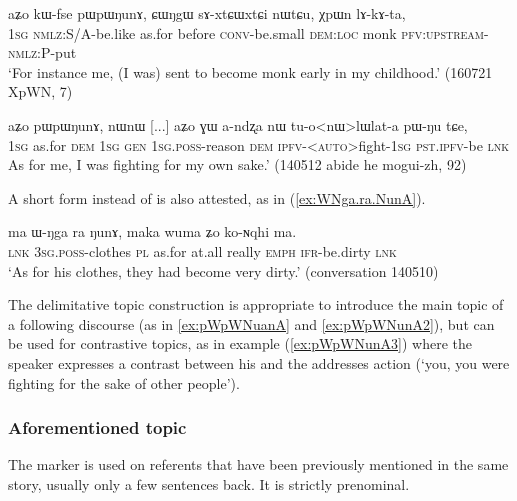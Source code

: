 \begin{exe}
\ex \label{ex:pWpWNunA2}
\gll  aʑo kɯ-fse pɯpɯŋunɤ, ɕɯŋgɯ sɤ-xtɕɯ\redp{}xtɕi nɯtɕu, χpɯn lɤ-kɤ-ta, \\
\textsc{1sg} \textsc{nmlz}:S/A-be.like as.for  before \textsc{conv}-\redp{}be.small \textsc{dem}:\textsc{loc} monk \textsc{pfv}:\textsc{upstream}-\textsc{nmlz}:P-put \\
\glt `For instance me, (I was) sent to become monk early in my childhood.' (160721 XpWN, 7)
  \end{exe}

\begin{exe}
\ex \label{ex:pWpWNunA3}
\gll aʑo pɯpɯŋunɤ, nɯnɯ [...] aʑo ɣɯ a-ndʐa nɯ tu-o<nɯ>lɯlat-a pɯ-ŋu tɕe, \\
\textsc{1sg} as.for \textsc{dem} { } \textsc{1sg} \textsc{gen} \textsc{1sg}.\textsc{poss}-reason \textsc{dem} \textsc{ipfv}-<\textsc{auto}>fight-\textsc{1sg} \textsc{pst}.\textsc{ipfv}-be \textsc{lnk} \\
\glt  As for me, I was fighting for my own sake.' (140512 abide he mogui-zh, 92)
 \end{exe}
 
A short form  instead of  is also attested, as in (\ref{ex:WNga.ra.NunA}).

\begin{exe}
\ex \label{ex:WNga.ra.NunA}
\gll ma ɯ-ŋga ra ŋunɤ, maka wuma ʑo ko-ɴqhi ma. \\
\textsc{lnk} \textsc{3sg}.\textsc{poss}-clothes \textsc{pl} as.for at.all really \textsc{emph} \textsc{ifr}-be.dirty \textsc{lnk} \\
\glt `As for his clothes, they had become very dirty.' (conversation 140510)
\end{exe}
 
The delimitative topic  construction is appropriate to introduce the main topic of a following discourse (as in \ref{ex:pWpWNuanA} and \ref{ex:pWpWNunA2}), but can be used for contrastive topics, as in example (\ref{ex:pWpWNunA3}) where the speaker expresses a contrast between his and the addresses action (`you, you were fighting for the sake of other people').


 \subsubsection{Aforementioned topic} \label{sec:iCqha}
 The marker   is used on referents that have been previously mentioned in the same story, usually only a few sentences back. It is strictly prenominal. 
 
